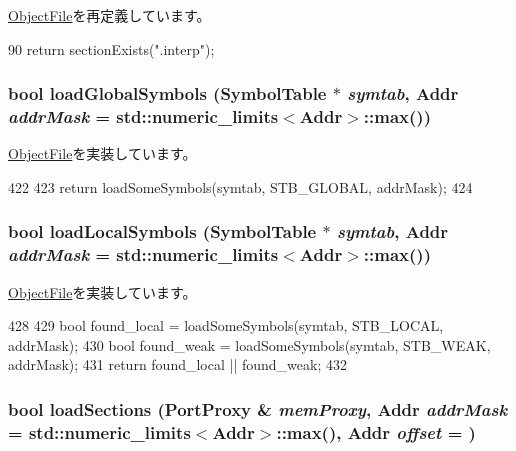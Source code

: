 \hyperlink{classObjectFile_adeb3f3d68421f3e5f75dbbdf998a21ac}{ObjectFile}を再定義しています。


\begin{DoxyCode}
90 { return sectionExists(".interp"); }
\end{DoxyCode}
\hypertarget{classElfObject_a1de102f86bbb53d20455d9e78be53935}{
\subsubsection[{loadGlobalSymbols}]{\setlength{\rightskip}{0pt plus 5cm}bool loadGlobalSymbols (SymbolTable $\ast$ {\em symtab}, \/  {\bf Addr} {\em addrMask} = {\ttfamily std::numeric\_\-limits$<${\bf Addr}$>$::max()})}}
\label{classElfObject_a1de102f86bbb53d20455d9e78be53935}


\hyperlink{classObjectFile_abd8b86c98494f055ba7e0babbd55f4a0}{ObjectFile}を実装しています。


\begin{DoxyCode}
422 {
423     return loadSomeSymbols(symtab, STB_GLOBAL, addrMask);
424 }
\end{DoxyCode}
\hypertarget{classElfObject_aab9393b89c15838ac1b842e642f981bb}{
\subsubsection[{loadLocalSymbols}]{\setlength{\rightskip}{0pt plus 5cm}bool loadLocalSymbols (SymbolTable $\ast$ {\em symtab}, \/  {\bf Addr} {\em addrMask} = {\ttfamily std::numeric\_\-limits$<${\bf Addr}$>$::max()})}}
\label{classElfObject_aab9393b89c15838ac1b842e642f981bb}


\hyperlink{classObjectFile_a15e7fbacc339ac9a4d50e4aa36591339}{ObjectFile}を実装しています。


\begin{DoxyCode}
428 {
429     bool found_local = loadSomeSymbols(symtab, STB_LOCAL, addrMask);
430     bool found_weak = loadSomeSymbols(symtab, STB_WEAK, addrMask);
431     return found_local || found_weak;
432 }
\end{DoxyCode}
\hypertarget{classElfObject_a69ba3469bb66a1ffa5049d581c1faf70}{
\subsubsection[{loadSections}]{\setlength{\rightskip}{0pt plus 5cm}bool loadSections ({\bf PortProxy} \& {\em memProxy}, \/  {\bf Addr} {\em addrMask} = {\ttfamily std::numeric\_\-limits$<${\bf Addr}$>$::max()}, \/  {\bf Addr} {\em offset} = {})}}
\label{classElfObject_a69ba3469bb66a1ffa5049d581c1faf70}



